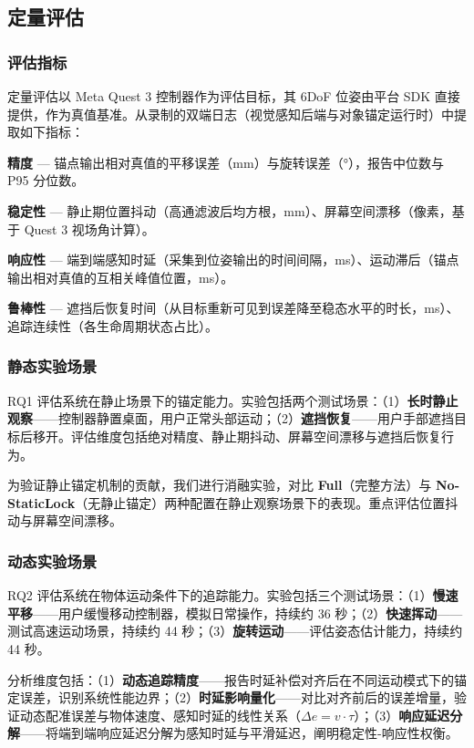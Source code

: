\documentclass[review]{vgtc}
\begin{document}
\subsection{定量评估}


\subsubsection{评估指标}


定量评估以 Meta Quest 3 控制器作为评估目标，其 6DoF 位姿由平台 SDK 直接提供，作为真值基准。从录制的双端日志（视觉感知后端与对象锚定运行时）中提取如下指标：

\textbf{精度} --- 锚点输出相对真值的平移误差（mm）与旋转误差（°），报告中位数与 P95 分位数。

\textbf{稳定性} --- 静止期位置抖动（高通滤波后均方根，mm）、屏幕空间漂移（像素，基于 Quest 3 视场角计算）。

\textbf{响应性} --- 端到端感知时延（采集到位姿输出的时间间隔，ms）、运动滞后（锚点输出相对真值的互相关峰值位置，ms）。

\textbf{鲁棒性} --- 遮挡后恢复时间（从目标重新可见到误差降至稳态水平的时长，ms）、追踪连续性（各生命周期状态占比）。

\subsubsection{静态实验场景}


RQ1 评估系统在静止场景下的锚定能力。实验包括两个测试场景：（1）\textbf{长时静止观察}------控制器静置桌面，用户正常头部运动；（2）\textbf{遮挡恢复}------用户手部遮挡目标后移开。评估维度包括绝对精度、静止期抖动、屏幕空间漂移与遮挡后恢复行为。

为验证静止锚定机制的贡献，我们进行消融实验，对比 \textbf{Full}（完整方法）与 \textbf{No-StaticLock}（无静止锚定）两种配置在静止观察场景下的表现。重点评估位置抖动与屏幕空间漂移。

\subsubsection{动态实验场景}


RQ2 评估系统在物体运动条件下的追踪能力。实验包括三个测试场景：（1）\textbf{慢速平移}------用户缓慢移动控制器，模拟日常操作，持续约 36 秒；（2）\textbf{快速挥动}------测试高速运动场景，持续约 44 秒；（3）\textbf{旋转运动}------评估姿态估计能力，持续约 44 秒。

分析维度包括：（1）\textbf{动态追踪精度}------报告时延补偿对齐后在不同运动模式下的锚定误差，识别系统性能边界；（2）\textbf{时延影响量化}------对比对齐前后的误差增量，验证动态配准误差与物体速度、感知时延的线性关系（$\Delta e = v \cdot \tau$）；（3）\textbf{响应延迟分解}------将端到端响应延迟分解为感知时延与平滑延迟，阐明稳定性-响应性权衡。
\end{document}
